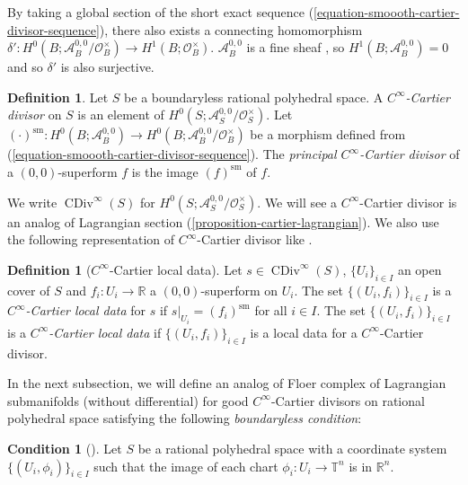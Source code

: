 \documentclass[a4paper,dvipdfmx,reqno,12pt]{amsart}
\theoremstyle{definition}
\newtheorem{definition}[theorem]{Definition}
\newtheorem{condition}[theorem]{Condition}
\newcommand{\opn}[1]{\operatorname{#1}}
\numberwithin{equation}{section}
\begin{document}
By taking a global section of the
short exact sequence
(\ref{equation-smoooth-cartier-divisor-sequence}),
there also exists a connecting homomorphism 
$\delta' \colon 
H^{0}(B;\mathcal{A}^{0,0}_{B}/\mathcal{O}^{\times}_B)
\to H^{1}(B;\mathcal{O}^{\times}_B)$. 
$\mathcal{A}^{0,0}_B$ is a fine sheaf 
\cite[Proposition 2.26]{MR3903579}, so 
$H^{1}(B;\mathcal{A}^{0,0}_B)=0$ and 
so $\delta'$ is also surjective.

\begin{definition}
Let $S$ be a boundaryless rational polyhedral space.
A \emph{$C^{\infty}$-Cartier divisor} on 
$S$ is an element of
$H^{0}(S;\mathcal{A}^{0,0}_{S}/\mathcal{O}^{\times}_S)$.
Let 
$(\cdot)^{\mathrm{sm}}\colon 
H^{0}(B;\mathcal{A}^{0,0}_B)\to 
H^{0}(B;\mathcal{A}^{0,0}_{B}/\mathcal{O}^{\times}_B)$ 
be a morphism defined from 
(\ref{equation-smoooth-cartier-divisor-sequence}).
The \emph{principal $C^{\infty}$-Cartier divisor} of a $(0,0)$-superform 
$f$ is the image $(f)^{\mathrm{sm}}$ of $f$.
\end{definition}
We write $\opn{CDiv}^{\infty}(S)$ for 
$H^{0}(S;\mathcal{A}^{0,0}_{S}/\mathcal{O}^{\times}_S)$.
We will see a $C^{\infty}$-Cartier divisor is
an analog of Lagrangian section 
(\cref{proposition-cartier-lagrangian}).
We also use the following representation of 
$C^{\infty}$-Cartier divisor like 
\cite[Definition 4.0.12]{MR2810322}.
\begin{definition}[{$C^{\infty}$-Cartier local data}]
Let $s\in \opn{CDiv}^{\infty}(S)$, 
$\{U_i\}_{i\in I}$ an open cover of $S$ and 
$f_i\colon U_i \to \mathbb{R}$ a $(0,0)$-superform
on $U_i$. The set 
$\{(U_i,f_i)\}_{i\in I}$ is 
a \emph{$C^{\infty}$-Cartier local data} for $s$ if 
$s|_{U_i}=(f_i)^{\mathrm{sm}}$ for all 
$i\in I$. The set $\{(U_i,f_i)\}_{i\in I}$ is a
\emph{$C^{\infty}$-Cartier local data} if 
$\{(U_i,f_i)\}_{i\in I}$ is a local data for 
a $C^{\infty}$-Cartier divisor.
\end{definition}


In the next subsection, 
we will define an analog of Floer complex of 
Lagrangian submanifolds
(without differential) for good $C^{\infty}$-Cartier 
divisors on rational polyhedral space satisfying 
the following \emph{boundaryless condition}:

\begin{condition}[{\cite[]{MR4246795}}]
\label{condition-Rn}
Let $S$ be a rational polyhedral space with 
a coordinate system $\{(U_i,\phi_i)\}_{i\in I}$
such that the image of each chart 
$\phi_i\colon U_i \to \mathbb{T}^{n}$
is in $\mathbb{R}^{n}$.
\end{condition}
\end{document}
